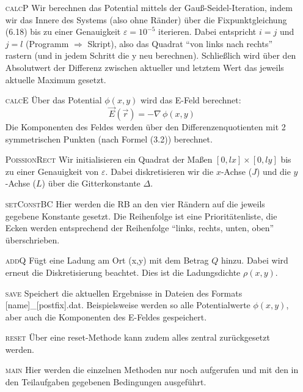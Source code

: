 \begin{enumerate}
\item[\textsc{calcP}] Wir berechnen das Potential mittels der Gauß-Seidel-Iteration, indem wir das Innere des Systems (also ohne Ränder) über die Fixpunktgleichung (6.18) bis zu einer Genauigkeit $\varepsilon = 10^{-5}$ iterieren. Dabei entspricht $i = j$ und $j = l$ (Programm $\Rightarrow$ Skript), also das Quadrat \enquote{von links nach rechts} rastern (und in jedem Schritt die y neu berechnen). Schließlich wird über den Absolutwert der Differenz zwischen aktueller und letztem Wert das jeweils aktuelle Maximum gesetzt.\\

\item[\textsc{calcE}] Über das Potential $\phi(x,y)$ wird das E-Feld berechnet:\\
\begin{equation}
\vec{E}(\vec{r}) = - \nabla\,\phi(x,y)
\end{equation}
Die Komponenten des Feldes werden über den Differenzenquotienten mit 2 symmetrischen Punkten (nach Formel (3.2)) berechnet.\\

\item[\textsc{PoissionRect}]
Wir initialisieren ein Quadrat der Maßen $[0,lx]\times[0,ly]$ bis zu einer Genauigkeit von $\varepsilon$. Dabei diskretisieren wir die $x$-Achse ($J$) und die $y$-Achse ($L$) über die Gitterkonstante $\Delta$.\\

\item[\textsc{setConstBC}]
Hier werden die RB an den vier Rändern auf die jeweils gegebene Konstante gesetzt. Die Reihenfolge ist eine Prioritätenliste, die Ecken werden entsprechend der Reihenfolge \enquote{links, rechts, unten, oben} überschrieben.\\

\item[\textsc{addQ}]
Fügt eine Ladung am Ort (x,y) mit dem Betrag $Q$ hinzu. Dabei wird erneut die Diskretisierung beachtet. Dies ist die Ladungsdichte $\rho(x,y)$.\\

\item[\textsc{save}]
Speichert die aktuellen Ergebnisse in Dateien des Formats \textsf{[name]\_[postfix].dat}. Beispielsweise werden so alle Potentialwerte $\phi(x,y)$, aber auch die Komponenten des E-Feldes gespeichert.\\

\item[\textsc{reset}]
Über eine reset-Methode kann zudem alles zentral zurückgesetzt werden.\\

\item[\textsc{main}]
Hier werden die einzelnen Methoden nur noch aufgerufen und mit den in den Teilaufgaben gegebenen Bedingungen ausgeführt.\\
\end{enumerate}

